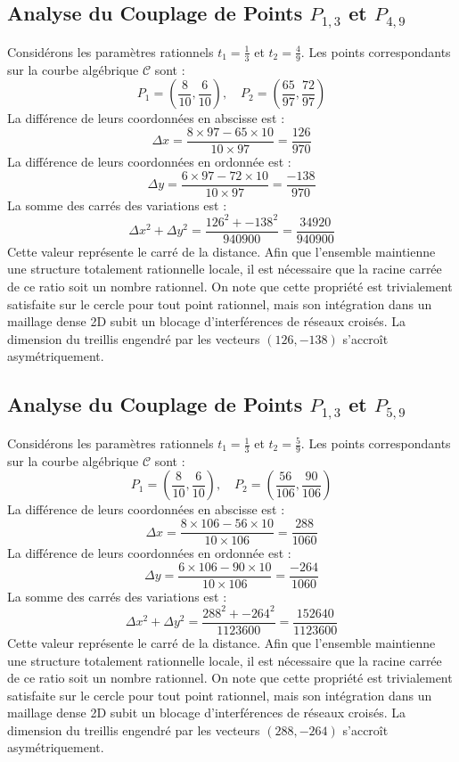 \documentclass[12pt, a4paper]{article}
\begin{document}
\subsection{Analyse du Couplage de Points $P_{1,3}$ et $P_{4,9}$}
Considérons les paramètres rationnels $t_1 = \frac{1}{3}$ et $t_2 = \frac{4}{9}$.
Les points correspondants sur la courbe algébrique $\mathcal{C}$ sont :
$$ P_1 = \left( \frac{8}{10}, \frac{6}{10} \right), \quad P_2 = \left( \frac{65}{97}, \frac{72}{97} \right) $$
La différence de leurs coordonnées en abscisse est :
$$ \Delta x = \frac{8 \times 97 - 65 \times 10}{10 \times 97} = \frac{126}{970} $$
La différence de leurs coordonnées en ordonnée est :
$$ \Delta y = \frac{6 \times 97 - 72 \times 10}{10 \times 97} = \frac{-138}{970} $$
La somme des carrés des variations est :
$$ \Delta x^2 + \Delta y^2 = \frac{ 126^2 + -138^2 }{ 940900 } = \frac{ 34920 }{ 940900 } $$
Cette valeur représente le carré de la distance. Afin que l'ensemble maintienne une structure totalement rationnelle locale, il est nécessaire que la racine carrée de ce ratio soit un nombre rationnel. On note que cette propriété est trivialement satisfaite sur le cercle pour tout point rationnel, mais son intégration dans un maillage dense 2D subit un blocage d'interférences de réseaux croisés. La dimension du treillis engendré par les vecteurs $( 126, -138 )$ s'accroît asymétriquement.


\subsection{Analyse du Couplage de Points $P_{1,3}$ et $P_{5,9}$}
Considérons les paramètres rationnels $t_1 = \frac{1}{3}$ et $t_2 = \frac{5}{9}$.
Les points correspondants sur la courbe algébrique $\mathcal{C}$ sont :
$$ P_1 = \left( \frac{8}{10}, \frac{6}{10} \right), \quad P_2 = \left( \frac{56}{106}, \frac{90}{106} \right) $$
La différence de leurs coordonnées en abscisse est :
$$ \Delta x = \frac{8 \times 106 - 56 \times 10}{10 \times 106} = \frac{288}{1060} $$
La différence de leurs coordonnées en ordonnée est :
$$ \Delta y = \frac{6 \times 106 - 90 \times 10}{10 \times 106} = \frac{-264}{1060} $$
La somme des carrés des variations est :
$$ \Delta x^2 + \Delta y^2 = \frac{ 288^2 + -264^2 }{ 1123600 } = \frac{ 152640 }{ 1123600 } $$
Cette valeur représente le carré de la distance. Afin que l'ensemble maintienne une structure totalement rationnelle locale, il est nécessaire que la racine carrée de ce ratio soit un nombre rationnel. On note que cette propriété est trivialement satisfaite sur le cercle pour tout point rationnel, mais son intégration dans un maillage dense 2D subit un blocage d'interférences de réseaux croisés. La dimension du treillis engendré par les vecteurs $( 288, -264 )$ s'accroît asymétriquement.
\end{document}
